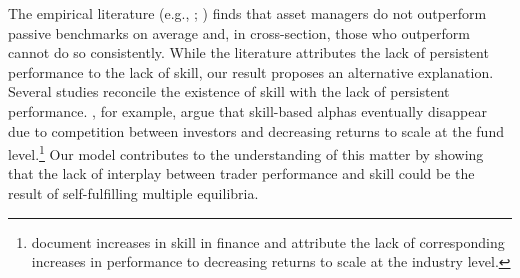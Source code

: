 The empirical literature (e.g., \citealp{jensen1967performance}; \citealp*{busse2010performance}) finds that asset managers do not outperform passive benchmarks on average and, in cross-section, those who outperform cannot do so consistently. While the literature attributes the lack of persistent performance to the lack of skill, our result proposes an alternative explanation. Several studies reconcile the existence of skill with the lack of persistent performance. \citet{berk2004mutual}, for example, argue that skill-based alphas eventually disappear due to competition between investors and decreasing returns to scale at the fund level.\footnote{\citet*{pastor2015scale} document increases in skill in finance and attribute the lack of corresponding increases in performance to decreasing returns to scale at the industry level.} Our model contributes to the understanding of this matter by showing that the lack of interplay between trader performance and skill could be the result of self-fulfilling multiple equilibria. 
%
%
